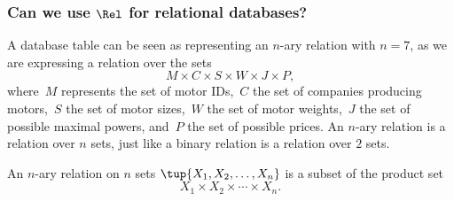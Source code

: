 \begin{table}[h]
    \centering
    \caption{A simplified catalogue of motors.}
    \label{tab:electric_motors}
\end{table}


\subsubsection{Can we use $\Rel$ for relational databases?}

A database table can be seen as representing an $n$-ary relation with $n = 7$, as we are expressing a relation
over the sets
\begin{equation*}
    M\times C\times S\times W\times J\times P,
\end{equation*}
where~$M$ represents the set of motor IDs,~$C$ the set of companies producing motors,~$S$ the set of motor sizes,~$W$ the set of motor weights,~$J$ the set of possible maximal powers, and~$P$ the set of possible prices.  An $n$-ary relation is a relation over $n$ sets, just like a binary relation is a
relation over $2$ sets.
\begin{definition}
An $n$-ary relation on $n$ sets $\tup{X_1, X_2, \dots, X_n}$ is a
subset of the product set
\begin{equation}
X_1 \times X_2 \times \cdots \times X_n.
\end{equation}
\end{definition}

